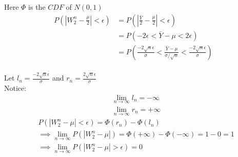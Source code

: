 \begin{enumerate}
Here $\Phi$ is the $CDF$ of $N(0,1)$ \newline \newline
\begin{align*}
P(|W_2^n - \frac{\mu}{2}| < \epsilon) &= P(|\frac{\bar{Y}}{2}- \frac{\mu}{2}| < \epsilon)\\
    &= P( - 2 \epsilon < \bar{Y} - \mu <  2 \epsilon)\\
    &= P( \frac{- 2 \sqrt{n} \epsilon}{\sigma} < \frac{\bar{Y} - \mu}{\sigma / \sqrt{n}} <  \frac{- 2 \sqrt{n} \epsilon}{\sigma})\\ 
\end{align*}

Let $l_n = \frac{- 2 \sqrt{n} \epsilon}{\sigma}$ and $r_n = \frac{2 \sqrt{n} \epsilon}{\sigma}$\\
Notice:
\begin{align*}
&\lim_{n \to \infty}  l_n = -\infty\\
&\lim_{n \to \infty}  r_n = +\infty
\end{align*}
\begin{align*}
&P(|W_2^n - \mu| < \epsilon) = \Phi(r_n) - \Phi(l_n)\\
&\implies \lim_{n \to \infty} P(|W_2^n - \mu|) =  \Phi(+\infty) - \Phi(-\infty)
= 1 - 0 = 1\\
&\implies \lim_{n \to \infty} P(|W_2^n - \mu| > \epsilon) = 0 
\end{align*}






\end{enumerate}

